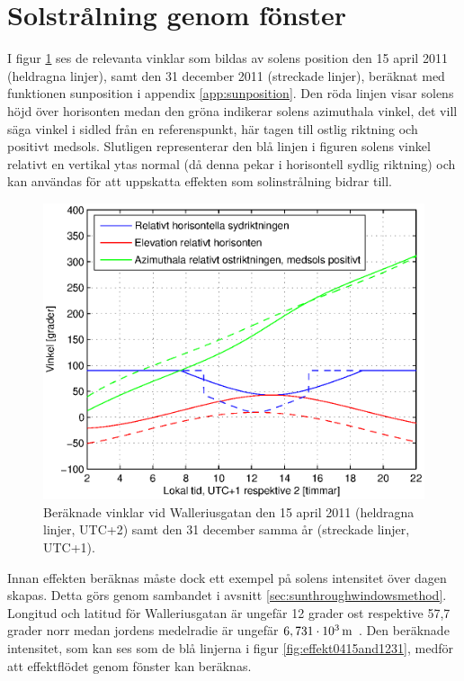 \section{Solstrålning genom fönster}

I figur \ref{fig:sun0415and1231} ses de relevanta vinklar som bildas av solens position den 15 april 2011 (heldragna linjer), samt den 31 december 2011 (streckade linjer), beräknat med funktionen sunposition i appendix \ref{app:sunposition}. Den röda linjen visar solens höjd över horisonten medan den gröna indikerar solens azimuthala vinkel, det vill säga vinkel i sidled från en referenspunkt, här tagen till ostlig riktning och positivt medsols. Slutligen representerar den blå linjen i figuren solens vinkel relativt en vertikal ytas normal (då denna pekar i horisontell sydlig riktning) och kan användas för att uppskatta effekten som solinstrålning bidrar till.

\begin{figure}[hpbt]
\centering
\includegraphics[scale=0.7]{images/sun0415and1231.eps}
\caption{\label{fig:sun0415and1231} Beräknade vinklar vid Walleriusgatan den 15 april 2011 (heldragna linjer, UTC+2) samt den 31 december samma år (streckade linjer, UTC+1).}
\end{figure}

Innan effekten beräknas måste dock ett exempel på solens intensitet över dagen skapas. Detta görs genom sambandet i avsnitt \ref{sec:sunthroughwindowsmethod}. Longitud och latitud för Walleriusgatan är ungefär 12 grader ost respektive 57,7 grader norr medan jordens medelradie är ungefär $\unit[6,731\cdot 10^{3}]{m}$ \cite{physicshandbook}. Den beräknade intensitet, som kan ses som de blå linjerna i figur \ref{fig:effekt0415and1231}, medför att effektflödet genom fönster kan beräknas.

